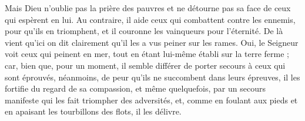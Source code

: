 Mais Dieu n'oublie pas la prière des pauvres et ne détourne pas sa face de ceux qui espèrent en lui. Au contraire, il aide ceux qui combattent contre les ennemis, pour qu’ils en triomphent, et il couronne les vainqueurs pour l’éternité. De là vient qu'ici on dit clairement qu’il les a vus peiner sur les rames. Oui, le Seigneur voit ceux qui peinent en mer, tout en étant lui-même établi sur la terre ferme ; car, bien que, pour un moment, il semble différer de porter secours à ceux qui sont éprouvés, néanmoins, de peur qu’ils ne succombent dans leurs épreuves, il les fortifie du regard de sa compassion, et même quelquefois, par un secours manifeste qui les fait triompher des adversités, et, comme en foulant aux pieds et en apaisant les tourbillons des flots, il les délivre.
